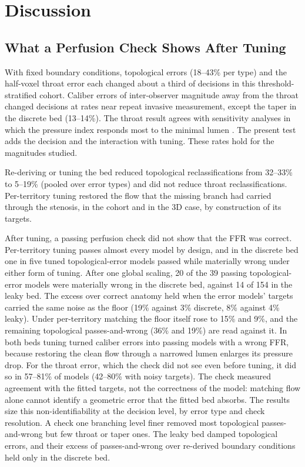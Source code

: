 \documentclass[journal,twoside,web]{ieeecolor}
\begin{document}
\section{Discussion}
\subsection{What a Perfusion Check Shows After Tuning}
With fixed boundary conditions, topological errors (18--43\% per type) and the half-voxel throat error each changed about a third of decisions in this threshold-stratified cohort. Caliber errors of inter-observer magnitude away from the throat changed decisions at rates near repeat invasive measurement, except the taper in the discrete bed (13--14\%). The throat result agrees with sensitivity analyses in which the pressure index responds most to the minimal lumen \cite{sankaran2015tmi,fernandez2024}. The present test adds the decision and the interaction with tuning. These rates hold for the magnitudes studied.

Re-deriving or tuning the bed reduced topological reclassifications from 32--33\% to 5--19\% (pooled over error types) and did not reduce throat reclassifications. Per-territory
tuning restored the flow that the missing branch had carried through the stenosis, in the cohort and in the 3D case, by construction of its targets.

After tuning, a passing perfusion check did not show that the FFR was correct. Per-territory tuning passes
almost every model by design, and in the discrete bed one in five tuned topological-error models passed while
materially wrong under either form of tuning. After one global scaling, 20 of the 39 passing topological-error models were materially wrong in the discrete bed, against 14 of 154 in the leaky bed. The excess over correct anatomy held when the error models' targets carried the same noise as the floor (19\% against 3\% discrete, 8\% against 4\% leaky). Under per-territory matching the floor itself rose to 15\% and 9\%, and the remaining topological passes-and-wrong (36\% and 19\%) are read against it. In both beds tuning turned caliber errors into passing models with a wrong FFR, because restoring the clean flow through a narrowed lumen enlarges its pressure drop. For the throat error, which the check did not see even before tuning, it did so in 57--81\% of models (42--80\% with noisy targets). The check measured agreement with the fitted targets, not the correctness of the model: matching flow alone cannot
identify a geometric error that the fitted bed absorbs. The results size this non-identifiability at the decision level, by error type and check resolution. A check one
branching level finer removed most topological passes-and-wrong but few throat or taper ones. The leaky
bed damped topological errors, and their excess of passes-and-wrong over re-derived boundary conditions held only in
the discrete bed.
\end{document}
